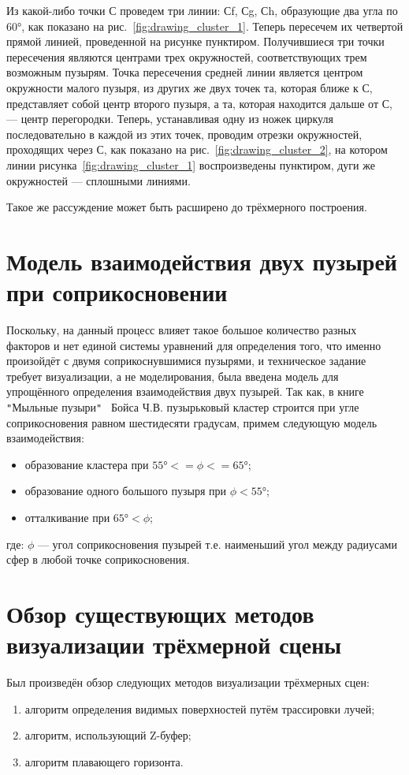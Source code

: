Из какой-либо точки С проведем три линии: 
Сf, Сg, Сh, образующие два угла по 60°, как показано 
на рис.~\ref{fig:drawing_cluster_1}. Теперь пересечем их четвертой прямой линией, проведенной на рисунке пунктиром. Получившиеся три точки пересечения являются центрами трех окружностей, соответствующих трем возможным пузырям. 
Точка пересечения средней линии является центром 
окружности малого пузыря, из других же двух точек 
та, которая ближе к С, представляет собой центр второго пузыря, а та, которая находится дальше от С, — центр перегородки. Теперь, устанавливая одну из ножек циркуля последовательно в каждой из этих точек, проводим отрезки окружностей, проходящих через С, как показано на рис.~\ref{fig:drawing_cluster_2}, на котором линии рисунка~\ref{fig:drawing_cluster_1} воспроизведены пунктиром, дуги же окружностей — сплошными линиями.

Такое же рассуждение может быть расширено до трёхмерного построения.

\section{Модель взаимодействия двух пузырей при соприкосновении}
\label{sec:model_of_contact}
Поскольку, на данный процесс влияет такое большое количество разных факторов и нет единой системы уравнений для определения того, что именно произойдёт с двумя соприкоснувшимися пузырями, и техническое задание требует визуализации, а не моделирования, была введена модель для упрощённого определения взаимодействия двух пузырей. Так как, в книге \verb|"|Мыльные пузыри\verb|"|~\cite{boys} Бойса Ч.В. пузырьковый кластер строится при угле соприкосновения равном шестидесяти градусам, примем следующую модель взаимодействия:
\begin{itemize}	
	\item образование кластера при $ 55° <= \phi <= 65°$;
	\item образование одного большого пузыря при $\phi < 55°$;
	\item отталкивание при $ 65° < \phi$;
\end{itemize}
где: $\phi$ --- угол соприкосновения пузырей т.е. наименьший угол между радиусами сфер в любой точке соприкосновения.
	
\section{Обзор существующих методов визуализации трёхмерной сцены}
Был произведён обзор следующих методов визуализации трёхмерных сцен:
\begin{enumerate}[label={\arabic*)}]
	\item алгоритм определения видимых поверхностей путём трассировки лучей;
	\item алгоритм, использующий Z-буфер;
	\item алгоритм плавающего горизонта.
\end{enumerate}

